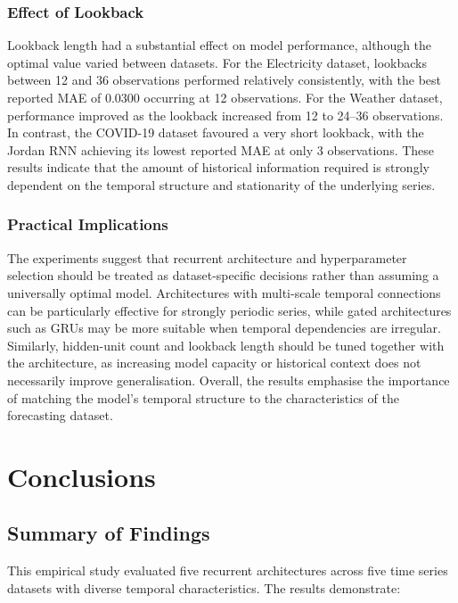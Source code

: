\documentclass[conference]{IEEEtran}
\begin{document}
\subsubsection{Effect of Lookback}

Lookback length had a substantial effect on model performance,
although the optimal value varied between datasets. For the
Electricity dataset, lookbacks between 12 and 36 observations performed
relatively consistently, with the best reported MAE of 0.0300 occurring
at 12 observations. For the Weather dataset, performance improved as the
lookback increased from 12 to 24--36 observations. In contrast, the
COVID-19 dataset favoured a very short lookback, with the Jordan RNN
achieving its lowest reported MAE at only 3 observations. These results
indicate that the amount of historical information required is
strongly dependent on the temporal structure and stationarity of the
underlying series.

\subsubsection{Practical Implications}

The experiments suggest that recurrent architecture and
hyperparameter selection should be treated as dataset-specific
decisions rather than assuming a universally optimal model.
Architectures with multi-scale temporal connections can be
particularly effective for strongly periodic series, while gated
architectures such as GRUs may be more suitable when temporal
dependencies are irregular. Similarly, hidden-unit count and
lookback length should be tuned together with the architecture, as
increasing model capacity or historical context does not necessarily
improve generalisation. Overall, the results emphasise the importance
of matching the model's temporal structure to the characteristics
of the forecasting dataset.


\section{Conclusions}

\label{sec:conclusions}

\subsection{Summary of Findings}

This empirical study evaluated five recurrent architectures across five time series datasets with diverse temporal characteristics. The results demonstrate:
\end{document}
